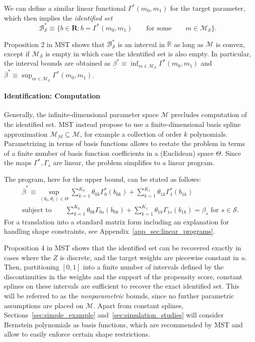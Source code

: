\documentclass[12pt,a4paper,english]{article} %
\numberwithin{equation}{section}
\theoremstyle{definition}
\theoremstyle{remark}
\theoremstyle{plain}
\begin{document}
We can define a similar linear functional $\Gamma^*(m_0, m_1)$ for the target parameter, which then implies the \textit{identified set}
\begin{equation}\label{eq:identified_set}
  \mathcal{B}^*_\mathcal{S} \equiv \{b\in\mathbf{R}: b = \Gamma^*(m_0, m_1) \qquad \text{for some} \qquad m \in \mathcal{M}_\mathcal{S}\}.
\end{equation}

Proposition 2 in MST shows that $\mathcal{B}_\mathcal{S}^*$ is an interval in $\mathbb{R}$ as long as $\mathcal{M}$ is convex, except if $\mathcal{M}_\mathcal{S}$ is empty in which case the identified set is also empty.
In particular, the interval bounds are obtained as $\underline{\beta}^* \equiv \inf_{m\in\mathcal{M}_\mathcal{S}}\Gamma^*(m_0, m_1)$ and $\overline{\beta}^* \equiv \sup_{m\in\mathcal{M}_\mathcal{S}}\Gamma^*(m_0, m_1)$.


\paragraph{Identification: Computation}
Generally, the infinite-dimensional parameter space $\mathcal{M}$ precludes computation of the identified set.
MST instead propose to use a finite-dimensional basis spline approximation $\mathcal{M}_{fd}\subseteq{\mathcal{M}}$, for example a collection of order $k$ polynomials.
Parametrizing in terms of basis functions allows to restate the problem in terms of a finite number of basis function coefficients in a (Euclidean) space $\Theta$.
Since the maps $\Gamma^*, \Gamma_s$ are linear, the problem simplifies to a linear program.

The program, here for the upper bound, can be stated as follows:
\begin{align}\label{eq:lp_identification}
  &\overline{\beta}^* \equiv \sup_{(\theta_0, \theta_1)\in\Theta} \sum_{k=1}^{K_0}\theta_{0k}\Gamma^*_0(b_{0k}) + \sum_{k=1}^{K_1}\theta_{1k}\Gamma^*_1(b_{1k}) \\
  &\text{subject to} \qquad \sum_{k=1}^{K_0}\theta_{0k}\Gamma_{0s}(b_{0k}) + \sum_{k=1}^{K_1}\theta_{1k}\Gamma_{1s}(b_{1k}) = \beta_s \text{ for } s \in \mathcal{S}.
\end{align}
For a translation into a standard matrix form including an explanation for handling shape constraints, see Appendix~\ref{app_sec:linear_programs}.

Proposition 4 in MST shows that the identified set can be recovered exactly in cases where the $Z$ is discrete, and the target weights are piecewise constant in $u$.
Then, partitioning $[0,1]$ into a finite number of intervals defined by the discontinuities in the weights and the support of the propensity score, constant splines on these intervals are sufficient to recover the exact identified set.
This will be referred to as the \textit{nonparametric} bounds, since no further parametric assumptions are placed on $\mathcal{M}$.
Apart from constant splines, Sections~\ref{sec:simple_example} and~\ref{sec:simulation_studies} will consider Bernstein polynomials as basis functions, which are recommended by MST and allow to easily enforce certain shape restrictions.
\end{document}
